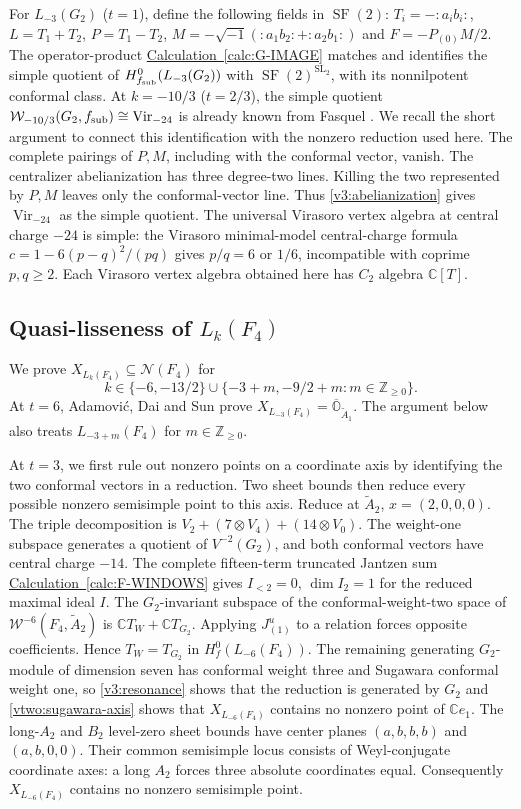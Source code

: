 \documentclass[11pt,a4paper]{amsart}
\numberwithin{equation}{section}
\theoremstyle{definition}
\theoremstyle{remark}
\newcommand{\C}{\mathbb C}
\newcommand{\Z}{\mathbb Z}
\newcommand{\N}{\mathcal N}
\newcommand{\OO}{\mathbb O}
\newcommand{\SF}{\operatorname{SF}}
\newcommand{\Vir}{\operatorname{Vir}}
\begin{document}
For $L_{-3}(G_2)$ ($t=1$), define the following fields in $\SF(2)$:
$T_i=-:a_ib_i:$, $L=T_1+T_2$, $P=T_1-T_2$,
$M=-\sqrt{-1}(:a_1b_2:+:a_2b_1:)$ and $F=-P_{(0)}M/2$.
The operator-product \hyperref[calc:G-IMAGE]{Calculation~\ref*{calc:G-IMAGE}} matches
\cite{Fasquel2025} and identifies the simple quotient of
$H^0_{f_{\rm sub}}(L_{-3}(G_2))$ with
$\SF(2)^{\mathrm{SL}_2}$, with its nonnilpotent conformal class.
At $k=-10/3$ ($t=2/3$), the simple quotient
$\mathcal W_{-10/3}(G_2,f_{\rm sub})\cong\Vir_{-24}$ is already known
from Fasquel \cite[Corollary~4.7(3)]{Fasquel2025}. We recall the short
argument to connect this identification with the nonzero reduction used here.
The complete pairings of $P,M$, including with the conformal vector, vanish. The centralizer abelianization has three degree-two lines.
Killing the two represented by $P,M$ leaves only the conformal-vector line.
Thus \cref{v3:abelianization} gives $\Vir_{-24}$ as the simple
quotient. The universal Virasoro vertex algebra at central charge $-24$ is simple:
the Virasoro minimal-model central-charge formula
$c=1-6(p-q)^2/(pq)$ gives $p/q=6$ or $1/6$, incompatible with
coprime $p,q\ge2$. Each Virasoro vertex algebra obtained here has $C_2$ algebra $\C[T]$.

\subsection{\texorpdfstring{Quasi-lisseness of $L_k(F_4)$}{Quasi-lisseness of Lk(F4)}}
We prove $X_{L_k(F_4)}\subseteq\N(F_4)$ for
$$
 k\in\{-6,-13/2\}\cup\{-3+m,-9/2+m:m\in\Z_{\ge0}\}.
$$
At $t=6$, Adamovi\'c, Dai and Sun \cite[Theorems~4.2 and~4.5]{ADS2026} prove
$X_{L_{-3}(F_4)}=\overline{\OO}_{\widetilde A_1}$.
The argument below also treats $L_{-3+m}(F_4)$ for $m\in\Z_{\ge0}$.

At $t=3$, we first rule out nonzero points on a coordinate axis by identifying the two
conformal vectors in a reduction. Two sheet bounds then reduce every
possible nonzero semisimple point to this axis.
Reduce at $\widetilde A_2$, $x=(2,0,0,0)$.
The triple decomposition is $V_2+(7\otimes V_4)+(14\otimes V_0)$.
The weight-one subspace generates a quotient of $V^{-2}(G_2)$,
and both conformal vectors have central charge
$-14$. The complete fifteen-term truncated Jantzen sum \hyperref[calc:F-WINDOWS]{Calculation~\ref*{calc:F-WINDOWS}}
gives $I_{<2}=0$, $\dim I_2=1$ for the reduced maximal ideal $I$.
The $G_2$-invariant subspace of the conformal-weight-two space of
$\mathcal W^{-6}(F_4,\widetilde A_2)$ is
$\C T_W+\C T_{G_2}$. Applying $J^u_{(1)}$ to a relation
forces opposite coefficients. Hence $T_W=T_{G_2}$ in $H_f^0(L_{-6}(F_4))$.
The remaining generating $G_2$-module of dimension seven has
conformal weight three and Sugawara conformal weight one, so
\cref{v3:resonance} shows that the reduction is generated by $G_2$ and
\cref{vtwo:sugawara-axis} shows that $X_{L_{-6}(F_4)}$ contains no
nonzero point of $\C e_1$.
The long-$A_2$ and $B_2$ level-zero sheet bounds
\cite[Theorem~3.5]{ArakawaFutornyKrizka2024} have center planes $(a,b,b,b)$ and
$(a,b,0,0)$. Their common semisimple locus consists of Weyl-conjugate
coordinate axes: a long $A_2$ forces three absolute coordinates equal.
Consequently $X_{L_{-6}(F_4)}$ contains no nonzero semisimple point.
\end{document}
